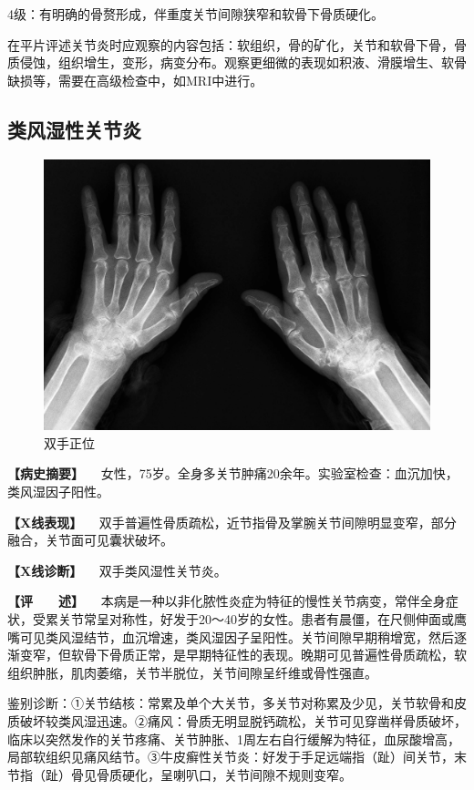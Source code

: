 4级：有明确的骨赘形成，伴重度关节间隙狭窄和软骨下骨质硬化。

在平片评述关节炎时应观察的内容包括：软组织，骨的矿化，关节和软骨下骨，骨质侵蚀，组织增生，变形，病变分布。观察更细微的表现如积液、滑膜增生、软骨缺损等，需要在高级检查中，如MRI中进行。

\subsection{类风湿性关节炎}

\begin{figure}[!htbp]
 \centering
 \includegraphics{./images/Image00116.jpg}
 \captionsetup{justification=centering}
 \caption{双手正位}
 \label{fig2-8-2}
  \end{figure} 

\textbf{【病史摘要】}
　女性，75岁。全身多关节肿痛20余年。实验室检查：血沉加快，类风湿因子阳性。

\textbf{【X线表现】}
　双手普遍性骨质疏松，近节指骨及掌腕关节间隙明显变窄，部分融合，关节面可见囊状破坏。

\textbf{【X线诊断】} 　双手类风湿性关节炎。

\textbf{【评　　述】}
　本病是一种以非化脓性炎症为特征的慢性关节病变，常伴全身症状，受累关节常呈对称性，好发于20～40岁的女性。患者有晨僵，在尺侧伸面或鹰嘴可见类风湿结节，血沉增速，类风湿因子呈阳性。关节间隙早期稍增宽，然后逐渐变窄，但软骨下骨质正常，是早期特征性的表现。晚期可见普遍性骨质疏松，软组织肿胀，肌肉萎缩，关节半脱位，关节间隙呈纤维或骨性强直。

鉴别诊断：①关节结核：常累及单个大关节，多关节对称累及少见，关节软骨和皮质破坏较类风湿迅速。②痛风：骨质无明显脱钙疏松，关节可见穿凿样骨质破坏，临床以突然发作的关节疼痛、关节肿胀、1周左右自行缓解为特征，血尿酸增高，局部软组织见痛风结节。③牛皮癣性关节炎：好发于手足远端指（趾）间关节，末节指（趾）骨见骨质硬化，呈喇叭口，关节间隙不规则变窄。

